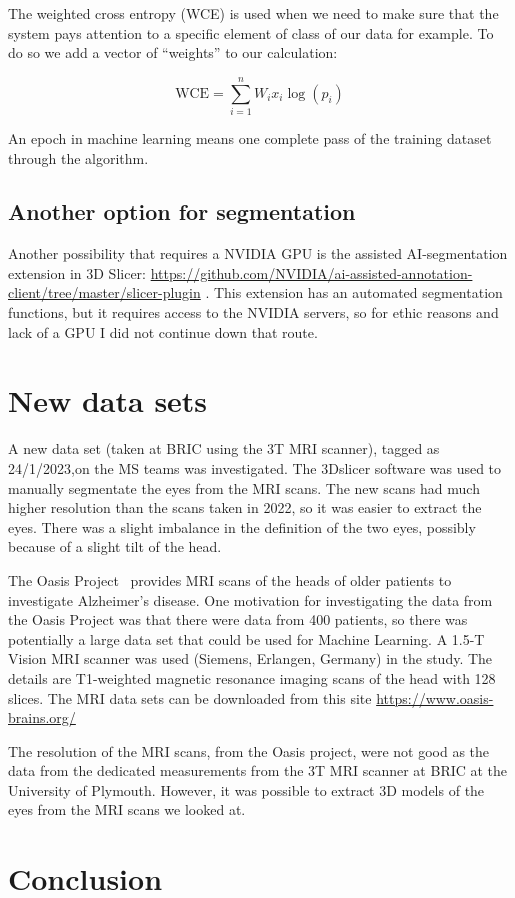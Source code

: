 \documentclass[12pt]{article}
\begin{document}
The weighted cross entropy (WCE) is used when we need to make sure
that the system pays attention to a specific element of class of our
data for example. To do so we add a vector of “weights” to our
calculation:

\begin{equation}
\mbox{WCE} = \sum_{i=1}^{n} W_i x_i \log(p_i)
\end{equation}

An epoch in machine learning means one complete pass of the training
dataset through the algorithm.


\subsection{Another option for segmentation}

Another possibility that requires a NVIDIA GPU is the assisted
AI-segmentation extension in 3D Slicer:
\url{https://github.com/NVIDIA/ai-assisted-annotation-client/tree/master/slicer-plugin}
.
This extension has an automated segmentation functions, but it
requires access to the NVIDIA servers, so for ethic reasons and lack
of a GPU I did not continue down that route.


\section{New data sets}

A new data set (taken at BRIC using the 3T MRI scanner), tagged as
24/1/2023,on the MS teams was investigated. The 3Dslicer software was
used to manually segmentate the eyes from the MRI scans. The new scans
had much higher resolution than the scans taken in 2022, so it was
easier to extract the eyes. There was a slight imbalance in the
definition of the two eyes, possibly because of a slight tilt of the
head.


The Oasis Project~\cite{van2021mri} provides MRI scans of the heads of
older patients to investigate Alzheimer's disease.  One motivation for
investigating the data from the Oasis Project was that there were data
from 400 patients, so there was potentially a large data set that
could be used for Machine Learning.  A 1.5-T Vision MRI scanner was
used (Siemens, Erlangen, Germany) in the study.  The details are
T1-weighted magnetic resonance imaging scans of the head with 128
slices.  The MRI data sets can be downloaded from this site
\url{https://www.oasis-brains.org/}


The resolution of the MRI scans, from the Oasis project, were not good
as the data from the dedicated measurements from the 3T MRI scanner at
BRIC at the University of Plymouth. However, it was possible to
extract 3D models of the eyes from the MRI scans we looked at.



\section{Conclusion}



\end{document}
